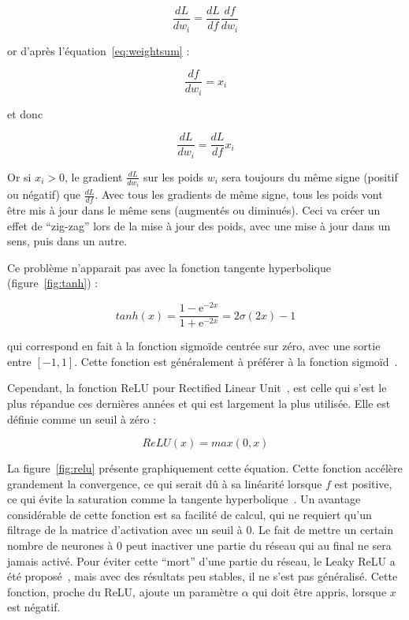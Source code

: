 \begin{equation}
	\frac{dL}{dw_i} = \frac{dL}{df} \frac{df}{dw_i}
	\label{eq:deriveN1}
\end{equation}

or d'après l'équation~\ref{eq:weightsum} :

\begin{equation}
	\frac{df}{dw_i} = x_i
	\label{eq:deriveN2}
\end{equation}

et donc 

\begin{equation}
	\frac{dL}{dw_i} = \frac{dL}{df}x_i
	\label{eq:deriveN3}
\end{equation}

Or si $x_i > 0$, le gradient $\frac{dL}{dw_i}$ sur les poids $w_i$ sera toujours du même signe (positif ou négatif) que $\frac{dL}{df}$.
Avec tous les gradients de même signe, tous les poids vont être mis à jour dans le même sens (augmentés ou diminués).
Ceci va créer un effet de ``zig-zag'' lors de la mise à jour des poids, avec une mise à jour dans un sens, puis dans un autre.

Ce problème n'apparait pas avec la fonction tangente hyperbolique (figure~\ref{fig:tanh}) :

\begin{equation}
tanh(x) = \frac{1-\text{e}^{-2x}}{1+\text{e}^{-2x}} = 2\sigma(2x) - 1
\label{eq:tanh}
\end{equation}

qui correspond en fait à la fonction sigmoïde centrée sur zéro, avec une sortie entre $ \left [-1,1 \right ]$.
Cette fonction est généralement à préférer à la fonction sigmoïd~\cite{lecun2012efficient}.

Cependant, la fonction ReLU pour Rectified Linear Unit~\cite{glorot2011deep}, est celle qui s'est le plus répandue ces dernières années et qui est largement la plus utilisée.
Elle est définie comme un seuil à zéro :

\begin{equation}
 ReLU(x) = max(0,x)
\label{eq:relu}
\end{equation}

La figure~\ref{fig:relu} présente graphiquement cette équation.
Cette fonction accélère grandement la convergence, ce qui serait dû à sa linéarité lorsque $f$ est positive, ce qui évite la saturation comme la tangente hyperbolique~\cite{krizhevsky2012imagenet}.
Un avantage considérable de cette fonction est sa facilité de calcul, qui ne requiert qu'un filtrage de la matrice d'activation avec un seuil à $0$.
Le fait de mettre un certain nombre de neurones à $0$ peut inactiver une partie du réseau qui au final ne sera jamais activé.
Pour éviter cette ``mort'' d'une partie du réseau, le Leaky ReLU a été proposé~\cite{he2015delving}, mais avec des résultats peu stables, il ne s'est pas généralisé.
Cette fonction, proche du ReLU, ajoute un paramètre $\alpha$ qui doit être appris, lorsque $x$ est négatif.

